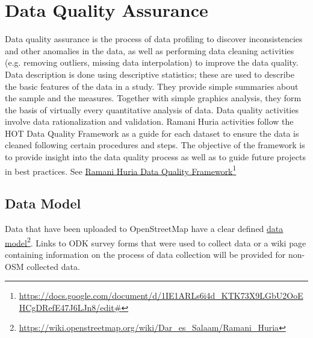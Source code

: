\documentclass[a4paper,12pt,twoside]{article}
\begin{document}
\newpage
\section{Data Quality Assurance}
\begin{multicols}{2}
Data quality assurance is the process of data profiling to discover inconsistencies and other anomalies in the data, as well as performing data cleaning activities (e.g. removing outliers, missing data interpolation) to improve the data quality. Data description is done using descriptive statistics; these are used to describe the basic features of the data in a study. They provide simple summaries about the sample and the measures. Together with simple graphics analysis, they form the basis of virtually every quantitative analysis of data. Data quality activities involve data rationalization and validation.
Ramani Huria activities follow the  HOT Data Quality Framework as a guide for each dataset to ensure the data is cleaned following certain procedures and steps. The objective of the framework is to provide insight into the data quality process as well as to guide future projects in best practices.
 See  \href{https://docs.google.com/document/d/1IE1ARLs6i4d_KTK73X9LGbU2OoEHCgDRefE47J6LJn8/edit#}{Ramani Huria Data Quality Framework}\footnote{\url{https://docs.google.com/document/d/1IE1ARLs6i4d_KTK73X9LGbU2OoEHCgDRefE47J6LJn8/edit#}}
\end{multicols}

\subsection{Data Model}
Data that have been uploaded to OpenStreetMap have a clear defined \href{https://wiki.openstreetmap.org/wiki/Dar_es_Salaam/Ramani_Huria}{data model}\footnote{\url{https://wiki.openstreetmap.org/wiki/Dar_es_Salaam/Ramani_Huria}}. Links to ODK survey forms that were used to collect data or a wiki page containing information on the process of data collection will be provided for non-OSM collected data.
\end{document}
